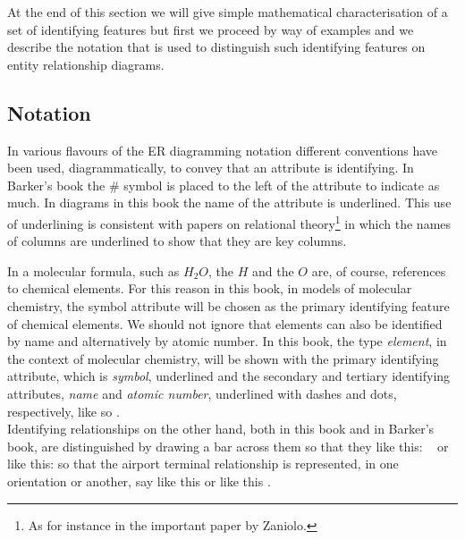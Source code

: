 At the end of this section we will give simple mathematical characterisation of a set of identifying features but first
we proceed by way of examples 
and we describe the notation that is used to distinguish such identifying features on entity relationship  diagrams.

\subsection{Notation}
\mynote
In various flavours of the ER diagramming notation different conventions have been used, diagrammatically, to convey that an attribute is identifying. In Barker's book the \# symbol is placed to the left of the attribute to indicate as much. In diagrams in this book the name of the attribute is underlined. This use of underlining is consistent with papers on relational theory\footnote{As for instance in the important paper by Zaniolo.} in which  the names of columns are underlined to show that they are key columns.

\mynote
In a molecular formula, such as $H_2O$, the $H$ and the $O$ are, of course, references to chemical elements. For this reason in this book,
in models of molecular chemistry, the symbol attribute will be chosen as the primary identifying feature of chemical elements. We should not ignore that elements can also be identified by name and alternatively by atomic number. 
In this book, the type \textit{element}, in the context of molecular chemistry, will be shown with the primary identifying attribute, which is \textit{symbol}, underlined and the secondary and tertiary identifying attributes, \textit{name} and \textit{atomic number}, underlined with dashes and dots, respectively, like so
\raisebox{-0.85cm}{\scalebox{0.95}{}}.\\
\vspace{0.2cm}
\mynote Identifying relationships on the other hand, both in this book and in Barker's book,
are distinguished by drawing a bar across them so that they like this: 
\barkerEllisJ\ \hspace{3pt}
or like this: \barkerEllisK \hspace{5pt}
so that the airport terminal relationship is represented, 
in one orientation or another, say like this
\raisebox{-1.4cm}{\scalebox{0.9}{}} 
or like this \raisebox{-0.45cm}{\scalebox{0.9}{}}.

